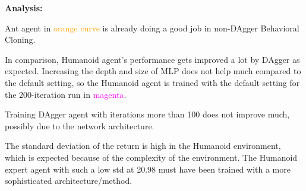 \documentclass{article}
\begin{document}
\textbf{Analysis:}

Ant agent in \textcolor{orange}{orange curve} is already doing a good job in non-DAgger Behavioral Cloning.

In comparison, Humanoid agent's performance gets improved a lot by DAgger as expected.
Increasing the depth and size of MLP does not help much compared to the default setting, so the Humanoid agent is trained with the default setting for the 200-iteration run in \textcolor{magenta}{magenta}.

Training DAgger agent with iterations more than 100 does not improve much, possibly due to the network architecture.

The standard deviation of the return is high in the Humanoid environment, which is expected because of the complexity of the environment.
The Humanoid expert agent with such a low std at 20.98 must have been trained with a more sophisticated architecture/method.
\end{document}
